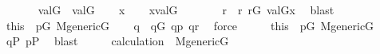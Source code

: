 \begin{isabellebody}
\isanewline
\isanewline
\ \ \isanewline
\ \ \ \ {\isachardoublequoteopen}val{\isacharparenleft}{\kern0pt}G{\isacharcomma}{\kern0pt}{\isasymtau}{\isacharparenright}{\kern0pt}\ {\isasymsubseteq}\ val{\isacharparenleft}{\kern0pt}G{\isacharcomma}{\kern0pt}{\isasymtheta}{\isacharparenright}{\kern0pt}{\isachardoublequoteclose}\isanewline
%
\isadelimproof
%
\endisadelimproof
%
\isatagproof
{}\isamarkupfalse%
\isanewline
\ \ \isamarkupfalse%
\ x\isanewline
\ \ \isamarkupfalse%
\ {\isachardoublequoteopen}x{\isasymin}val{\isacharparenleft}{\kern0pt}G{\isacharcomma}{\kern0pt}{\isasymtau}{\isacharparenright}{\kern0pt}{\isachardoublequoteclose}\isanewline
\ \ \isamarkupfalse%
\isanewline
\ \ \isamarkupfalse%
\ {\isasymsigma}\ r\ \ {\isachardoublequoteopen}{\isasymlangle}{\isasymsigma}{\isacharcomma}{\kern0pt}r{\isasymrangle}{\isasymin}{\isasymtau}{\isachardoublequoteclose}\ {\isachardoublequoteopen}r{\isasymin}G{\isachardoublequoteclose}\ {\isachardoublequoteopen}val{\isacharparenleft}{\kern0pt}G{\isacharcomma}{\kern0pt}{\isasymsigma}{\isacharparenright}{\kern0pt}{\isacharequal}{\kern0pt}x{\isachardoublequoteclose}\ \isamarkupfalse%
\ blast\isanewline
\ \ \isamarkupfalse%
\ \isamarkupfalse%
\ this\ \ {\isacartoucheopen}p{\isasymin}G{\isacartoucheclose}\ {\isacartoucheopen}M{\isacharunderscore}{\kern0pt}generic{\isacharparenleft}{\kern0pt}G{\isacharparenright}{\kern0pt}{\isacartoucheclose}\isanewline
\ \ \isamarkupfalse%
\ q\ \ {\isachardoublequoteopen}q{\isasymin}G{\isachardoublequoteclose}\ {\isachardoublequoteopen}q{\isasympreceq}p{\isachardoublequoteclose}\ {\isachardoublequoteopen}q{\isasympreceq}r{\isachardoublequoteclose}\ \isamarkupfalse%
\ force\isanewline
\ \ \isamarkupfalse%
\ \isamarkupfalse%
\ this\ \ {\isacartoucheopen}p{\isasymin}G{\isacartoucheclose}\ {\isacartoucheopen}M{\isacharunderscore}{\kern0pt}generic{\isacharparenleft}{\kern0pt}G{\isacharparenright}{\kern0pt}{\isacartoucheclose}\isanewline
\ \ \isamarkupfalse%
\ {\isachardoublequoteopen}q{\isasymin}P{\isachardoublequoteclose}\ {\isachardoublequoteopen}p{\isasymin}P{\isachardoublequoteclose}\ \isamarkupfalse%
\ blast{\isacharplus}{\kern0pt}\isanewline
\ \ \isamarkupfalse%
\ \isamarkupfalse%
\ calculation\ \ {\isacartoucheopen}M{\isacharunderscore}{\kern0pt}generic{\isacharparenleft}{\kern0pt}G{\isacharparenright}{\kern0pt}{\isacartoucheclose}\isanewline

\end{isabellebody}

